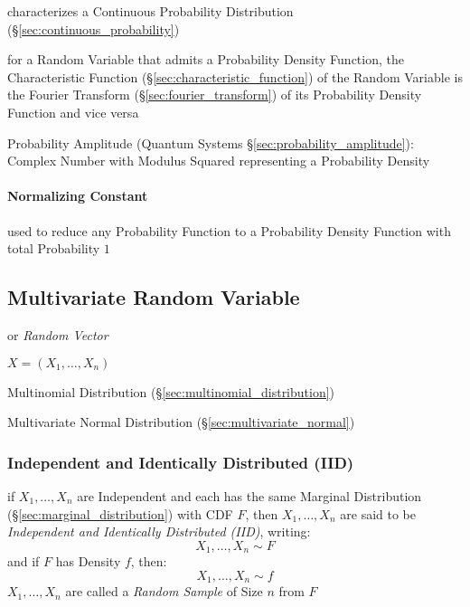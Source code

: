 characterizes a Continuous Probability Distribution
(\S\ref{sec:continuous_probability})

for a Random Variable that admits a Probability Density Function, the
Characteristic Function (\S\ref{sec:characteristic_function}) of the Random
Variable is the Fourier Transform (\S\ref{sec:fourier_transform}) of its
Probability Density Function and vice versa

\fist Probability Amplitude (Quantum Systems \S\ref{sec:probability_amplitude}):
Complex Number with Modulus Squared representing a Probability Density



\paragraph{Normalizing Constant}\label{sec:normalizing_constant}\hfill

used to reduce any Probability Function to a Probability Density Function with
total Probability $1$



\subsection{Multivariate Random Variable}\label{sec:random_vector}

or \emph{Random Vector}

$X = (X_1, \ldots, X_n)$

Multinomial Distribution (\S\ref{sec:multinomial_distribution})

Multivariate Normal Distribution (\S\ref{sec:multivariate_normal})



\subsubsection{Independent and Identically Distributed (IID)}\label{sec:iid}

if $X_1, \ldots, X_n$ are Independent and each has the same Marginal
Distribution (\S\ref{sec:marginal_distribution}) with CDF $F$, then $X_1,
\ldots, X_n$ are said to be \emph{Independent and Identically Distributed
  (IID)}, writing:
\[
  X_1, \ldots, X_n \sim F
\]
and if $F$ has Density $f$, then:
\[
  X_1, \ldots, X_n \sim f
\]
$X_1, \ldots, X_n$ are called a \emph{Random Sample} of Size $n$ from $F$ 

